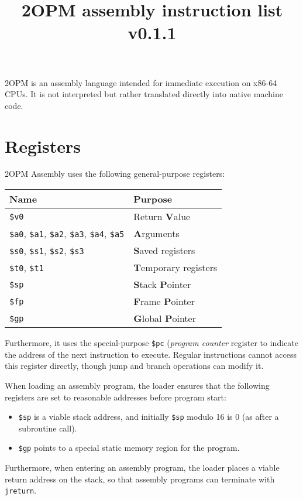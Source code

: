 \documentclass{article}
\title{2OPM assembly instruction list\\ \normalsize v0.1.1}
\begin{document}
\maketitle

2OPM is an assembly language intended for immediate execution on
x86-64 CPUs. It is not interpreted but rather translated directly into
native machine code.

\section{Registers}
2OPM Assembly uses the following general-purpose registers:


  \begin{tabular}{|p{6cm}|l|}
    \hline
    \textbf{Name} & \textbf{Purpose} \\
    \hline
    \hline
    \texttt{\$v0} & Return \textbf{V}alue\\
    \texttt{\$a0}, \texttt{\$a1}, \texttt{\$a2}, \texttt{\$a3}, \texttt{\$a4}, \texttt{\$a5} & \textbf{A}rguments\\
    \texttt{\$s0}, \texttt{\$s1}, \texttt{\$s2}, \texttt{\$s3} & \textbf{S}aved registers \\
    \texttt{\$t0}, \texttt{\$t1} & \textbf{T}emporary registers \\
    \texttt{\$sp} & \textbf{S}tack \textbf{P}ointer\\
    \texttt{\$fp} & \textbf{F}rame \textbf{P}ointer\\
    \texttt{\$gp} & \textbf{G}lobal \textbf{P}ointer\\
    \hline
  \end{tabular}


Furthermore, it uses the special-purpose \texttt{\$pc} (\emph{program counter} register to indicate
the address of the next instruction to execute.  Regular instructions cannot access this register directly,
though jump and branch operations can modify it.

When loading an assembly program, the loader ensures that the following registers are set to reasonable
addresses before program start:
\begin{itemize}
  \item \texttt{\$sp} is a viable stack address, and initially \texttt{\$sp} modulo 16 is 0 (as after a subroutine call).
  \item \texttt{\$gp} points to a special static memory region for the program.
\end{itemize}
Furthermore, when entering an assembly program, the loader places a viable return address on the stack,
so that assembly programs can terminate with \texttt{jreturn}.
\end{document}
